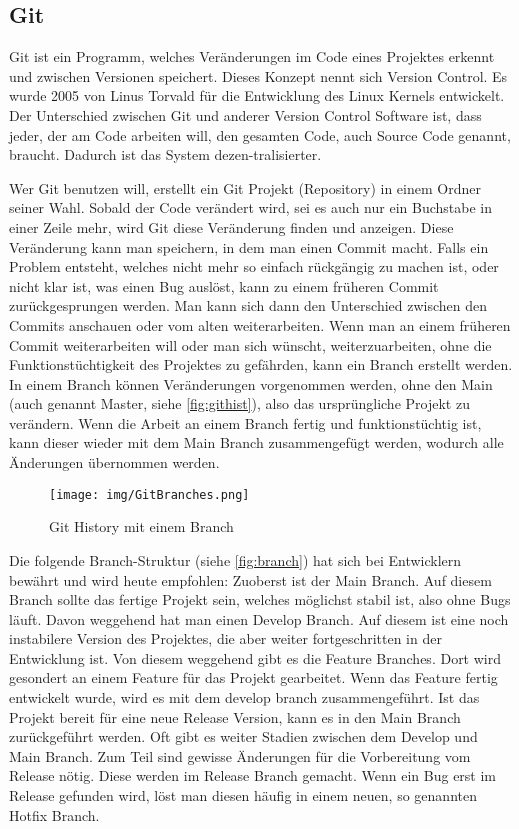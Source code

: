 \subsection*{Git}
Git ist ein Programm, welches Veränderungen im Code eines Projektes erkennt und
zwischen Versionen speichert. Dieses Konzept nennt sich Version Control. Es
wurde 2005 von Linus Torvald für die Entwicklung des Linux Kernels entwickelt.
Der Unterschied zwischen Git und anderer Version Control Software ist, dass
jeder, der am Code arbeiten will, den gesamten Code, auch Source Code genannt,
braucht. Dadurch ist das System dezen\hyp{}tralisierter.
\cite{noauthor_git_2021}

Wer Git benutzen will, erstellt ein Git Projekt (Repository) in einem Ordner
seiner Wahl. Sobald der Code verändert wird, sei es auch nur ein Buchstabe in
einer Zeile mehr, wird Git diese Veränderung finden und anzeigen. Diese
Veränderung kann man speichern, in dem man einen Commit macht. Falls ein Problem
entsteht, welches nicht mehr so einfach rückgängig zu machen ist, oder nicht
klar ist, was einen Bug auslöst, kann zu einem früheren Commit zurückgesprungen
werden. Man kann sich dann den Unterschied zwischen den Commits anschauen oder
vom alten weiterarbeiten. Wenn man an einem früheren Commit weiterarbeiten will
oder man sich wünscht, weiterzuarbeiten, ohne die Funktionstüchtigkeit des
Projektes zu gefährden, kann ein Branch erstellt werden. In einem Branch können
Veränderungen vorgenommen werden, ohne den Main (auch genannt Master, siehe
\autoref{fig:githist}), also das ursprüngliche Projekt zu verändern. Wenn die
Arbeit an einem Branch fertig und funktionstüchtig ist, kann dieser wieder mit dem
Main Branch zusammengefügt werden, wodurch alle Änderungen übernommen werden. 

\begin{figure}[htp]
    \centering
    \texttt{[image: img/GitBranches.png]}
    \caption{Git History mit einem Branch \cite{fireship_git_2020}}
    \label{fig:githist}
\end{figure}

Die folgende Branch-Struktur (siehe \autoref{fig:branch}) hat sich bei Entwicklern bewährt und wird heute
empfohlen: Zuoberst ist der Main Branch. Auf diesem Branch sollte das fertige Projekt
sein, welches möglichst stabil ist, also ohne Bugs läuft. Davon weggehend hat man
einen Develop Branch. Auf diesem ist eine noch instabilere Version des
Projektes, die aber weiter fortgeschritten in der Entwicklung ist. Von diesem
weggehend gibt es die Feature Branches. Dort wird gesondert an einem Feature für
das Projekt gearbeitet. Wenn das Feature fertig entwickelt wurde, wird es mit
dem develop branch zusammengeführt. Ist das Projekt bereit für eine neue
Release Version, kann es in den Main Branch zurückgeführt werden. Oft gibt
es weiter Stadien zwischen dem Develop und Main Branch. Zum Teil sind
gewisse Änderungen für die Vorbereitung vom Release nötig. Diese werden im
Release Branch gemacht. Wenn ein Bug erst im Release gefunden wird, löst man
diesen häufig in einem neuen, so genannten Hotfix Branch.
\cite{noauthor_successful_nodate}

